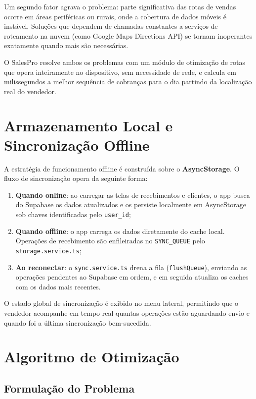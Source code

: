 \documentclass[
	12pt,				%
	oneside,			%
	a4paper,			%
	english,			%
	brazil				%
	]{abntex2}
\begin{document}
Um segundo fator agrava o problema: parte significativa das rotas de vendas ocorre em áreas periféricas ou rurais, onde a cobertura de dados móveis é instável. Soluções que dependem de chamadas constantes a serviços de roteamento na nuvem (como Google Maps Directions API) se tornam inoperantes exatamente quando mais são necessárias.

O SalesPro resolve ambos os problemas com um módulo de otimização de rotas que opera inteiramente no dispositivo, sem necessidade de rede, e calcula em milissegundos a melhor sequência de cobranças para o dia partindo da localização real do vendedor.

\section{Armazenamento Local e Sincronização Offline}

A estratégia de funcionamento offline é construída sobre o \textbf{AsyncStorage}. O fluxo de sincronização opera da seguinte forma:

\begin{enumerate}
  \item \textbf{Quando online}: ao carregar as telas de recebimentos e clientes, o app busca do Supabase os dados atualizados e os persiste localmente em AsyncStorage sob chaves identificadas pelo \texttt{user\_id};
  \item \textbf{Quando offline}: o app carrega os dados diretamente do cache local. Operações de recebimento são enfileiradas no \texttt{SYNC\_QUEUE} pelo \texttt{storage.service.ts};
  \item \textbf{Ao reconectar}: o \texttt{sync.service.ts} drena a fila (\texttt{flushQueue}), enviando as operações pendentes ao Supabase em ordem, e em seguida atualiza os caches com os dados mais recentes.
\end{enumerate}

O estado global de sincronização é exibido no menu lateral, permitindo que o vendedor acompanhe em tempo real quantas operações estão aguardando envio e quando foi a última sincronização bem-sucedida.

\section{Algoritmo de Otimização}

\subsection{Formulação do Problema}
\end{document}
